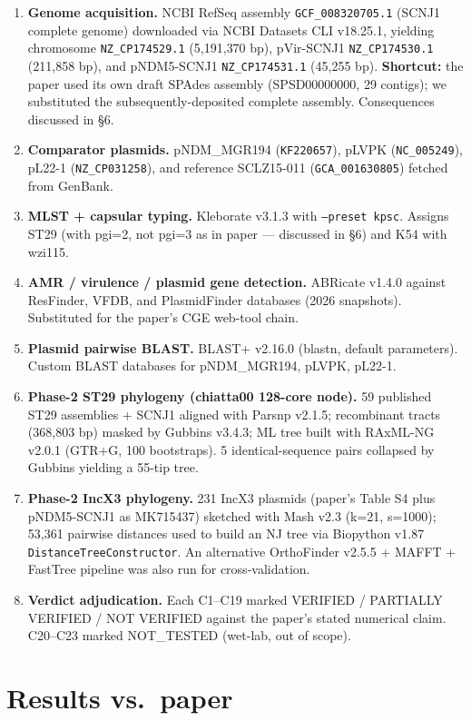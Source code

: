\documentclass[11pt,letterpaper]{article}
\begin{document}
\begin{enumerate}
\item \textbf{Genome acquisition.} NCBI RefSeq assembly \texttt{GCF\_008320705.1} (SCNJ1 complete genome) downloaded via NCBI Datasets CLI v18.25.1, yielding chromosome \texttt{NZ\_CP174529.1} (5{,}191{,}370 bp), pVir-SCNJ1 \texttt{NZ\_CP174530.1} (211{,}858 bp), and pNDM5-SCNJ1 \texttt{NZ\_CP174531.1} (45{,}255 bp). \textbf{Shortcut:} the paper used its own draft SPAdes assembly (SPSD00000000, 29 contigs); we substituted the subsequently-deposited complete assembly. Consequences discussed in \S6.
\item \textbf{Comparator plasmids.} pNDM\_MGR194 (\texttt{KF220657}), pLVPK (\texttt{NC\_005249}), pL22-1 (\texttt{NZ\_CP031258}), and reference SCLZ15-011 (\texttt{GCA\_001630805}) fetched from GenBank.
\item \textbf{MLST + capsular typing.} Kleborate v3.1.3 with \texttt{--preset kpsc}. Assigns ST29 (with pgi=2, not pgi=3 as in paper --- discussed in \S6) and K54 with wzi115.
\item \textbf{AMR / virulence / plasmid gene detection.} ABRicate v1.4.0 against ResFinder, VFDB, and PlasmidFinder databases (2026 snapshots). Substituted for the paper's CGE web-tool chain.
\item \textbf{Plasmid pairwise BLAST.} BLAST+ v2.16.0 (blastn, default parameters). Custom BLAST databases for pNDM\_MGR194, pLVPK, pL22-1.
\item \textbf{Phase-2 ST29 phylogeny (chiatta00 128-core node).} 59 published ST29 assemblies + SCNJ1 aligned with Parsnp v2.1.5; recombinant tracts (368{,}803 bp) masked by Gubbins v3.4.3; ML tree built with RAxML-NG v2.0.1 (GTR+G, 100 bootstraps). 5 identical-sequence pairs collapsed by Gubbins yielding a 55-tip tree.
\item \textbf{Phase-2 IncX3 phylogeny.} 231 IncX3 plasmids (paper's Table S4 plus pNDM5-SCNJ1 as MK715437) sketched with Mash v2.3 (k=21, s=1000); 53{,}361 pairwise distances used to build an NJ tree via Biopython v1.87 \texttt{DistanceTreeConstructor}. An alternative OrthoFinder v2.5.5 + MAFFT + FastTree pipeline was also run for cross-validation.
\item \textbf{Verdict adjudication.} Each C1--C19 marked VERIFIED / PARTIALLY VERIFIED / NOT VERIFIED against the paper's stated numerical claim. C20--C23 marked NOT\_TESTED (wet-lab, out of scope).
\end{enumerate}

\section{Results vs.\ paper}
\end{document}
